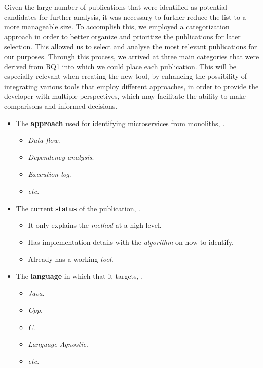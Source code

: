 Given the large number of publications that were identified as potential
candidates for further analysis, it was necessary to further reduce the list to
a more manageable size. To accomplish this, we employed a categorization
approach in order to better organize and prioritize the publications for later
selection. This allowed us to select and analyse the most relevant publications
for our purposes. Through this process, we arrived at three main categories
that were derived from RQ1 into which we could place each publication. This
will be especially relevant when creating the new tool, by enhancing the
possibility of integrating various tools that employ different approaches, in
order to provide the developer with multiple perspectives, which may facilitate
the ability to make comparisons and informed decisions.

\begin{itemize}
  \item The \textbf{approach} used for identifying microservices from
    monoliths, .
  \begin{itemize}
    \item \textit{Data flow}.
    \item \textit{Dependency analysis}.
    \item \textit{Execution log}.
    \item \textit{etc}.
  \end{itemize}
  \item The current \textbf{status} of the publication,
    .
  \begin{itemize}
    \item It only explains the \textit{method} at a high level.
    \item Has implementation details with the \textit{algorithm} on how to
      identify.
    \item Already has a working \textit{tool}.
  \end{itemize}
  \item The \textbf{language} in which that it targets,
    .
  \begin{itemize}
    \item \textit{Java}.
    \item \textit{Cpp}.
    \item \textit{C}.
    \item \textit{Language Agnostic}.
    \item \textit{etc}.
  \end{itemize}
\end{itemize}

